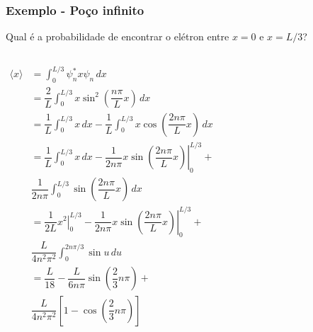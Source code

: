 \documentclass[12pt,brazil,table]{beamer}
\begin{document}
\begin{frame}
  \frametitle{Exemplo - Poço infinito}  
  \fontsize{8pt}{11pt}\selectfont
  
  Qual é a probabilidade de encontrar o elétron entre $x=0$ e $x=L/3$?
  \begin{columns}[c]
  
      \column{5cm}
        \fontsize{7pt}{11pt}\selectfont
      \begin{align*}
        \langle x \rangle &=\int_{0}^{L/3}\psi_{n}^{*}x\psi_{n}\,dx\\
            &=\dfrac{2}{L}\int_{0}^{L/3}x\sin^{2}\left(\dfrac{n\pi}{L}x\right)\,dx\\
            &=\dfrac{1}{L}\int_{0}^{L/3}x\,dx-\dfrac{1}{L}\int_{0}^{L/3}x\cos\left(\dfrac{2n\pi}{L}x\right)\,dx\\&=\dfrac{1}{L}\int_{0}^{L/3}x\,dx-\left.\dfrac{1}{2n\pi}x\sin\left(\dfrac{2n\pi}{L}x\right)\right|_{0}^{L/3}+\\
            &\dfrac{1}{2n\pi}\int_{0}^{L/3}\sin\left(\dfrac{2n\pi}{L}x\right)\,dx\\
            &=\dfrac{1}{2L}\left.x^{2}\right|_{0}^{L/3}-\left.\dfrac{1}{2n\pi}x\sin\left(\dfrac{2n\pi}{L}x\right)\right|_{0}^{L/3}+\\
            & \dfrac{L}{4n^{2}\pi^{2}}\int_{0}^{2n\pi/3}\sin u\,du\\
            &=\dfrac{L}{18}-\dfrac{L}{6n\pi}\sin\left(\dfrac{2}{3}n\pi\right)+\\
            &\dfrac{L}{4n^{2}\pi^{2}}\left[1-\cos\left(\dfrac{2}{3}n\pi\right)\right]
      \end{align*}
      

\end{columns}
\end{frame}
\end{document}
